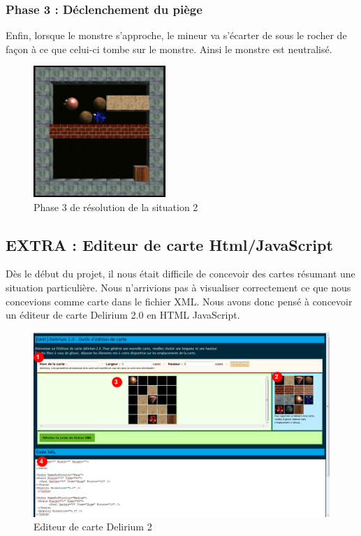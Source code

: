 \documentclass[a4paper,11pt]{article}
\begin{document}
	\subsubsection{Phase 3 : D\'eclenchement du pi\`ege}
	
Enfin, lorsque le monstre s'approche, le mineur va s'\'ecarter de sous le rocher de façon \`a ce que celui-ci tombe sur le monstre. Ainsi le monstre est neutralis\'e.

		\begin{figure}[h]
			\center
			\includegraphics[width=5cm]{situation2-4}
			\caption{\label{situation22} Phase 3 de r\'esolution de la situation 2 }
		\end{figure}
		
	\newpage
	\subsection{EXTRA : Editeur de carte Html/JavaScript}
	
D\`es le d\'ebut du projet, il nous \'etait difficile de concevoir des cartes r\'esumant une situation particuli\`ere. Nous n'arrivions pas \`a visualiser correctement ce que nous concevions comme carte dans le fichier XML. Nous avons donc pens\'e \`a concevoir un \'editeur de carte Delirium 2.0 en HTML \/ JavaScript.

	\begin{figure}[h]
			\center
			\includegraphics[width=12cm]{editeur}
			\caption{\label{situation22} Editeur de carte Delirium 2 }
		\end{figure}
		
\end{document}
